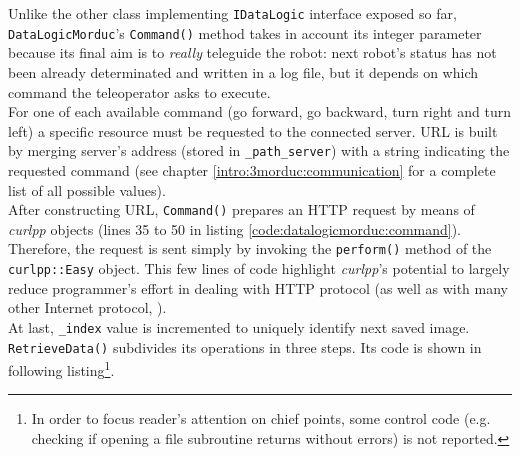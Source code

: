 Unlike the other class implementing \texttt{IDataLogic} interface
exposed so far, \texttt{DataLogicMorduc}'s \texttt{Command()} method takes
in account its integer parameter because its final aim is to
\textit{really} teleguide the robot: next robot's status has
not been already determinated and written in a log file, but it depends
on which command the teleoperator asks to execute.
\\
For one of each available command (go forward, go backward, turn right
and turn left) a specific resource must be requested to the connected
\morduc{} server. URL is built by merging server's address (stored
in \texttt{\_path\_server}) with a string indicating the requested
command (see chapter \ref{intro:3morduc:communication} for a complete
list of all possible values).
\\
After constructing URL, \texttt{Command()} prepares an HTTP
request by means of \textit{curlpp} objects (lines 35 to 50 in listing
\ref{code:datalogicmorduc:command}). Therefore, the request is sent
simply by invoking the \texttt{perform()} method of the
\texttt{curlpp::Easy} object. This few lines of code highlight
\textit{curlpp}'s potential to largely reduce programmer's effort in
dealing with HTTP protocol (as well as with many other Internet protocol,
\cite{library:curlpp}).
\\
At last, \texttt{\_index} value is incremented to uniquely identify
next saved image.
\\
\texttt{RetrieveData()} subdivides its operations in three steps. Its
code is shown in following listing\footnote{In order to
focus reader's attention on chief points, some control code (e.g. checking
if opening a file subroutine returns without errors) is not reported.}.
\\
